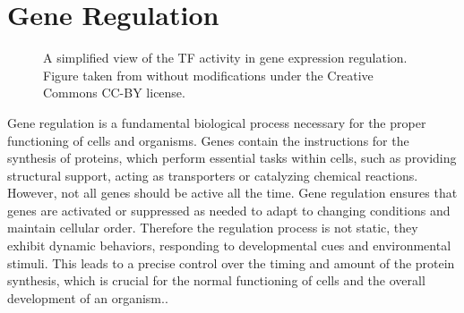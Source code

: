 \documentclass[pdftex,12pt,a4paper]{report}
\begin{document}
\section{Gene Regulation}
\begin{figure}
	\caption{A simplified view of the TF activity in gene expression regulation. Figure taken from \cite{TF_fig} without modifications under the Creative Commons CC-BY license.}
	\label{TF_function}
\end{figure}
Gene regulation is a fundamental biological process necessary for the proper functioning of cells and organisms. Genes contain the instructions for the synthesis of proteins, which perform essential tasks within cells, such as providing structural support, acting as transporters or catalyzing chemical reactions. However, not all genes should be active all the time. Gene regulation ensures that genes are activated or suppressed as needed to adapt to changing conditions and maintain cellular order.
Therefore the regulation process is not static, they exhibit dynamic behaviors, responding to developmental cues and environmental stimuli\cite{GRN2}. 
This leads to a precise control over the timing and amount of the protein synthesis, which is crucial for the normal functioning of cells and the overall development of an organism.\cite{proteinfunction}.
\end{document}
